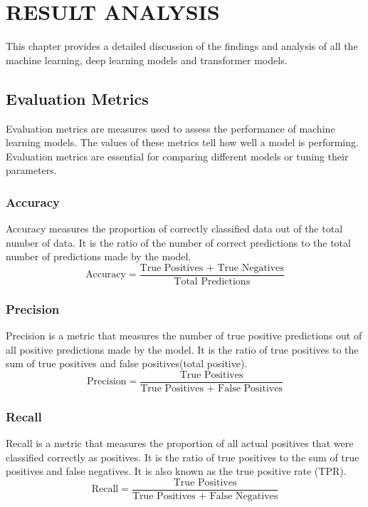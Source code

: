 \chapter{RESULT ANALYSIS}
\onehalfspacing
\label{anotherchapter}
\vspace{-3em}

This chapter provides a detailed discussion of the findings and analysis of all the machine learning, deep learning models and transformer models.

\section{Evaluation Metrics}
Evaluation metrics are measures used to assess the performance of machine learning models. The values of these metrics tell how well a model is performing. Evaluation metrics are essential for comparing different models or tuning their parameters.

\subsection{Accuracy}
Accuracy measures the proportion of correctly classified data out of the total number of data. It is the ratio of the number of correct predictions to the total number of predictions made by the model. 
\begin{equation}
\text{Accuracy} = \frac{\text{True Positives + True Negatives}}{\text{Total Predictions}}
\end{equation}

\subsection{Precision}
Precision is a metric that measures the number of true positive predictions out of all positive predictions made by the model. It is the ratio of true positives to the sum of true positives and false positives(total positive). 
\begin{equation}
    \text{Precision} = \frac{\text{True Positives}}{\text{True Positives + False Positives}}
\end{equation}

\subsection{Recall}
Recall is a metric that measures the proportion of all actual positives that were classified correctly as positives. It is the ratio of true positives to the sum of true positives and false negatives. It is also known as the true positive rate (TPR). 
\begin{equation}
    \text{Recall} = \frac{\text{True Positives}}{\text{True Positives + False Negatives}}
\end{equation}

